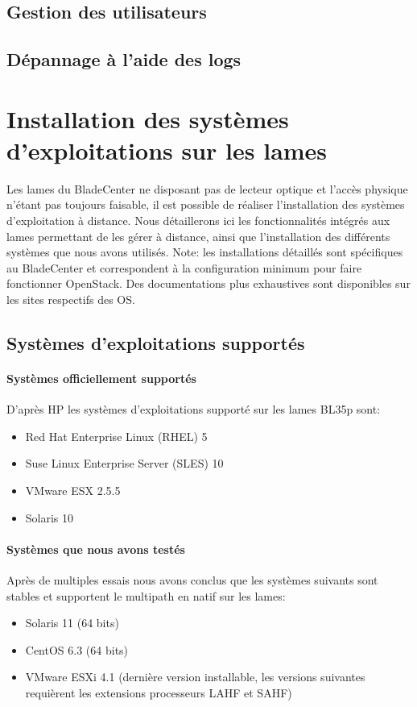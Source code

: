 \documentclass[a4paper,oneside]{report}
\begin{document}
\section{Gestion des utilisateurs}

\section{Dépannage à l'aide des logs} 


\chapter{Installation des systèmes d'exploitations sur les lames} \label{sec:installos}
Les lames du BladeCenter ne disposant pas de lecteur optique et l'accès physique n'étant pas toujours faisable, il est possible de réaliser l'installation des systèmes d'exploitation à distance.
Nous détaillerons ici les fonctionnalités intégrés aux lames permettant de les gérer à distance, ainsi que l'installation des différents systèmes que nous avons utilisés.\newline
Note: les installations détaillés sont spécifiques au BladeCenter et correspondent à la configuration minimum pour faire fonctionner OpenStack. Des documentations plus exhaustives sont disponibles sur les sites respectifs des OS.

\section{Systèmes d'exploitations supportés}
\subsubsection{Systèmes officiellement supportés}
D'après HP les systèmes d'exploitations supporté sur les lames BL35p sont:
\begin{itemize}
\item Red Hat Enterprise Linux (RHEL) 5
\item Suse Linux Enterprise Server (SLES) 10
\item VMware ESX 2.5.5
\item Solaris 10
\end{itemize}

\subsubsection{Systèmes que nous avons testés}
Après de multiples essais nous avons conclus que les systèmes suivants sont stables et supportent le multipath en natif sur les lames:
\begin{itemize}
\item Solaris 11 (64 bits)
\item CentOS 6.3 (64 bits)
\item VMware ESXi 4.1 (dernière version installable, les versions suivantes requièrent les extensions processeurs LAHF et SAHF)
\end{itemize}
\end{document}
